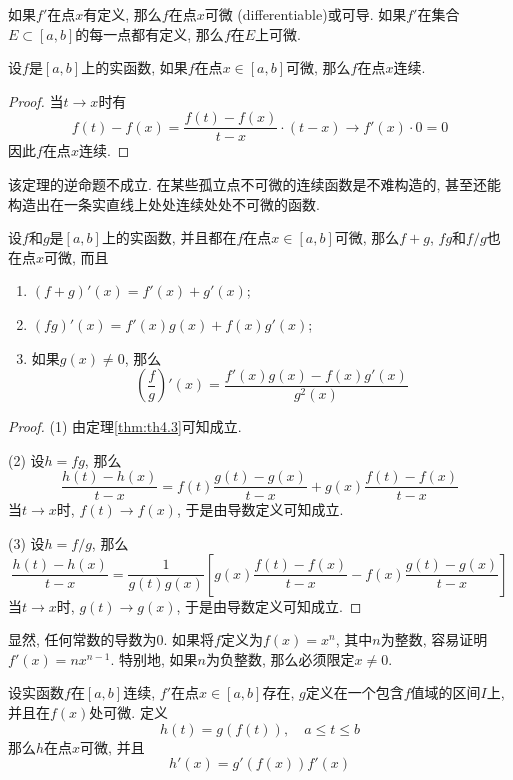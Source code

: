 \documentclass[cn,12pt,math=mtpro2,citestyle=gb7714-2015,bibstyle=gb7714-2015,twocol]{elegantbook}
\begin{document}
如果$f'$在点$x$有定义, 那么$f$在点$x$可微 (differentiable)或可导. 如果$f'$在集合$E\subset[a,b]$的每一点都有定义, 那么$f$在$E$上可微.

\begin{theorem}\label{thm:th5.2}
  设$f$是$[a,b]$上的实函数, 如果$f$在点$x\in[a,b]$可微, 那么$f$在点$x$连续.
\end{theorem}
\begin{proof}
  当$t\rightarrow x$时有
  $$f(t)-f(x)=\frac{f(t)-f(x)}{t-x}\cdot (t-x)\rightarrow f'(x)\cdot 0=0$$
  因此$f$在点$x$连续.


\end{proof}
\begin{remark}
该定理的逆命题不成立. 在某些孤立点不可微的连续函数是不难构造的, 甚至还能构造出在一条实直线上处处连续处处不可微的函数.
\end{remark}
\begin{theorem}\label{thm:th5.1}
  设$f$和$g$是$[a,b]$上的实函数, 并且都在$f$在点$x\in[a,b]$可微, 那么$f+g$, $fg$和$f/g$也在点$x$可微, 而且
  \begin{enumerate}[label=(\arabic*)]
  \item $(f+g)'(x)=f'(x)+g'(x)$;

  \item $(fg)'(x)=f'(x)g(x)+f(x)g'(x)$;

  \item 如果$g(x)\neq0$, 那么$$\left(\frac{f}{g}\right)'(x)=\frac{f'(x)g(x)-f(x)g'(x)}{g^2(x)}$$
  \end{enumerate}
\end{theorem}
\begin{proof}
  (1) 由定理\ref{thm:th4.3}可知成立.

  (2) 设$h=fg$, 那么
  $$\frac{h(t)-h(x)}{t-x}=f(t)\frac{g(t)-g(x)}{t-x}+g(x)\frac{f(t)-f(x)}{t-x}$$
  当$t\rightarrow x$时, $f(t)\rightarrow f(x)$, 于是由导数定义可知成立.

  (3) 设$h=f/g$, 那么
  $$\frac{h(t)-h(x)}{t-x}=\frac{1}{g(t)g(x)}\left[g(x)\frac{f(t)-f(x)}{t-x}-f(x)\frac{g(t)-g(x)}{t-x}\right]$$
  当$t\rightarrow x$时, $g(t)\rightarrow g(x)$, 于是由导数定义可知成立.


\end{proof}
\begin{example}
显然, 任何常数的导数为0. 如果将$f$定义为$f(x)=x^n$, 其中$n$为整数, 容易证明$f'(x)=nx^{n-1}$. 特别地, 如果$n$为负整数, 那么必须限定$x\neq 0$.
\end{example}
\begin{theorem}[链式法则]
  设实函数$f$在$[a,b]$连续, $f'$在点$x\in[a,b]$存在, $g$定义在一个包含$f$值域的区间$I$上, 并且在$f(x)$处可微. 定义
  $$h(t)=g(f(t)),\quad a\leq t \leq b$$
  那么$h$在点$x$可微, 并且
  \begin{equation}\label{eq5.2}
    h'(x)=g'(f(x))f'(x)
  \end{equation}
\end{theorem}
\end{document}

